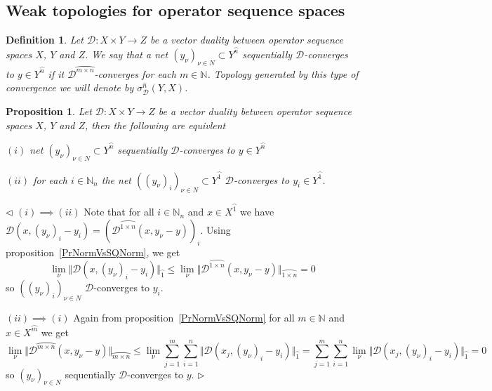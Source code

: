 \documentclass[12pt]{article}
\newtheorem{proposition}[theorem]{Proposition}
\newtheorem{definition}[theorem]{Definition}
\newenvironment{proof}{\par $\triangleleft$}{$\triangleright$}
\begin{document}
\subsection{Weak topologies for operator sequence spaces}


\begin{definition}\label{DefSQDconv} Let $\mathcal{D}:X\times Y\to Z$ be a 
vector duality between operator sequence spaces $X$, $Y$ and $Z$. We say that a 
net ${(y_\nu)}_{\nu\in N}\subset Y^{\wideparen{n}}$ sequentially 
$\mathcal{D}$-converges to $y\in Y^{\wideparen{n}}$ if it 
$\mathcal{D}^{\wideparen{m\times n}}$-converges for each $m\in\mathbb{N}$. 
Topology generated by this type of convergence we will denote 
by $\sigma_{\mathcal{D}}^{\widehat{n}}(Y,X)$.
\end{definition}

\begin{proposition}\label{PrDConvEquivCoordwsConv} Let 
$\mathcal{D}:X\times Y\to Z$ be a vector duality between operator sequence 
spaces $X$, $Y$ and $Z$, then the following are equivlent

$(i)$ net ${(y_\nu)}_{\nu\in N}\subset Y^{\wideparen{n}}$ sequentially 
$\mathcal{D}$-converges to $y\in Y^{\wideparen{n}}$

$(ii)$ for each $i\in\mathbb{N}_n$ the net 
${( {(y_\nu)}_i)}_{\nu\in N}\subset Y^{\wideparen{1}}$ $\mathcal{D}$-converges 
to $y_i\in Y^{\wideparen{1}}$.
\end{proposition}
\begin{proof}
$(i)\implies (ii)$ Note that for all $i\in\mathbb{N}_n$ and 
$x\in X^{\wideparen{1}}$ we have 
$\mathcal{D}(x,{(y_\nu)}_i-y_i)
={(\mathcal{D}^{\wideparen{1\times n}}(x,y_\nu-y))}_i$. 
Using proposition~\ref{PrNormVsSQNorm}, we get
$$
\lim\limits_{\nu}\Vert \mathcal{D}(x,{(y_\nu)}_i-y_i)\Vert_{\wideparen{1}}
\leq\lim\limits_{\nu}\Vert \mathcal{D}^{\wideparen{1\times
n}}(x,y_\nu-y)\Vert_{\wideparen{1\times n}}=0
$$
so ${({(y_\nu)}_i)}_{\nu\in N}$ $\mathcal{D}$-converges to $y_i$.

$(ii) \implies (i)$ Again from proposition~\ref{PrNormVsSQNorm} for all 
$m\in\mathbb{N}$ and $x\in X^{\wideparen{m}}$ we get
$$
\lim\limits_{\nu}\Vert
    \mathcal{D}^{\wideparen{m\times n}}(x,y_\nu-y)
\Vert_{\wideparen{m\times n}}
\leq\lim\limits_{\nu}\sum\limits_{j=1}^{m}\sum\limits_{i=1}^n\Vert
    \mathcal{D}{(x_j,{(y_\nu)}_i-y_i)}
\Vert_{\wideparen{1}}
=\sum\limits_{j=1}^{m}\sum\limits_{i=1}^n\lim\limits_{\nu}\Vert
    \mathcal{D}{(x_j,{(y_\nu)}_i-y_i)}
\Vert_{\wideparen{1}}=0
$$
so ${(y_\nu)}_{\nu\in N}$ sequentially $\mathcal{D}$-converges to $y$.
\end{proof}
\end{document}

